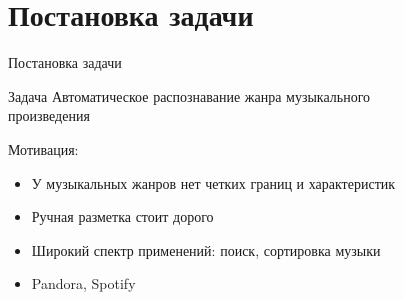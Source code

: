 \documentclass[xcolor=svgnames,handout]{beamer}
\begin{document}
\section
  {Постановка задачи}
\begin{frame}
  {Постановка задачи}



  \begin{block}{Задача}
    Автоматическое распознавание жанра музыкального \\произведения 
  \end{block}
  \begin{minipage}{0.45\textwidth}
  \begin{flushleft}
  Мотивация:
  \begin{itemize}
      \item У музыкальных жанров нет четких границ и характеристик
      \item Ручная разметка стоит дорого
      \item Широкий спектр применений: поиск, сортировка музыки
      \item Pandora, Spotify
  \end{itemize}
  \end{flushleft}
  \end{minipage}
  \begin{minipage}{0.47\textwidth}
  \begin{flushright}
	\begin{figure}[H]
        \begin{minipage}[h]{0.3\linewidth}

\end{minipage}
\end{figure}
\end{flushright}
\end{minipage}
\end{frame}
\end{document}
